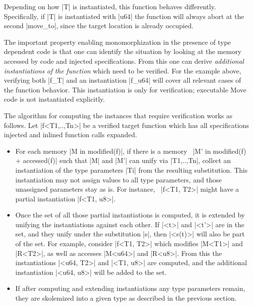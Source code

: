 \noindent Depending on how |T| is instantiated, this function behaves
differently.  Specifically, if |T| is instantiated with |u64| the function will
always abort at the second |move_to|, since the target location is already
occupied.

The important property enabling monomorphization in the presence of type
dependent code is that one can identify the situation by looking at the memory
accessed by code and injected specifications. From this one can derive
\emph{additional instantiations of the function} which need to be verified. For
the example above, verifying both |f_T| and an instantiation |f_u64| will cover
all relevant cases of the function behavior.
This instantiation is only for verification; executable Move code is not
instantiated explicitly.


The algorithm for computing the instances that require verification works as
follows. Let |f<T1,..,Tn>| be a verified target function which has all
specifications injected and inlined function calls expanded.
\begin{itemize}
\item For each memory |M in modified(f)|, if there is a memory~%
  |M' in modified(f) + accessed(f)| such that |M| and |M'| can unify via
  |T1,..,Tn|, collect an instantiation of the type parameters |Ti| from the
  resulting substitution. This instantiation may not assign values to all type
  parameters, and those unassigned parameters stay as is. For instance,~%
  |f<T1, T2>| might have a partial instantiation |f<T1, u8>|.
\item Once the set of all those partial instantiations is computed, it is
  extended by unifying the instantiations against each other. If |<t>| and
  |<t'>| are in the set, and they unify under the substitution |s|, then
  |<s(t)>| will also be part of the set.  For example, consider |f<T1, T2>|
  which modifies |M<T1>| and |R<T2>|, as well as accesses |M<u64>| and
  |R<u8>|. From this the instantiations |<u64, T2>| and |<T1, u8>| are computed,
  and the additional instantiation |<u64, u8>| will be added to the set.
\item If after computing and extending instantiations any type parameters
  remain, they are skolemized into a given type as described in the previous
  section.
\end{itemize}


